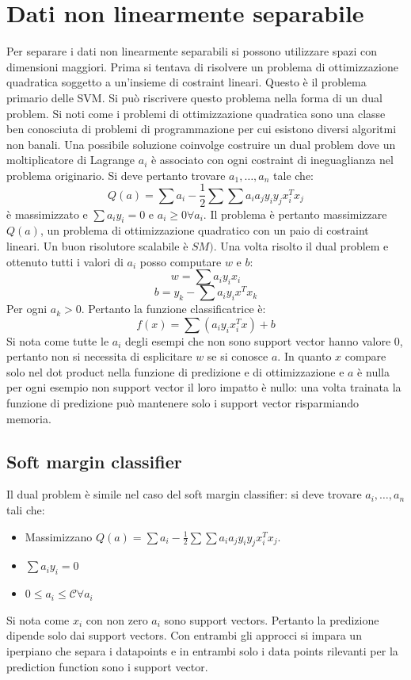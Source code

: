 \section{Dati non linearmente separabile}
Per separare i dati non linearmente separabili si possono utilizzare spazi con dimensioni maggiori.
Prima si tentava di risolvere un problema di ottimizzazione quadratica soggetto a un'insieme di costraint lineari.
Questo \`e il problema primario delle SVM.
Si pu\`o riscrivere questo problema nella forma di un dual problem.
Si noti come i problemi di ottimizzazione quadratica sono una classe ben conosciuta di problemi di programmazione per cui esistono diversi algoritmi non banali.
Una possibile soluzione coinvolge costruire un dual problem dove un moltiplicatore di Lagrange $a_i$ \`e associato con ogni costraint di ineguaglianza nel problema originario.
Si deve pertanto trovare $a_1,\dots,a_n$ tale che:
$$Q(a) = \sum a_i - \frac{1}{2}\sum\sum a_ia_jy_iy_jx_i^Tx_j$$
\`e massimizzato e $\sum a_iy_i = 0$ e $a_i\ge 0\forall a_i$.
Il problema \`e pertanto massimizzare $Q(a)$, un problema di ottimizzazione quadratico con un paio di costraint lineari.
Un buon risolutore scalabile \`e $SM)$.
Una volta risolto il dual problem e ottenuto tutti i valori di $a_i$ posso computare $w$ e $b$:
$$w=\sum a_iy_ix_i$$
$$b = y_k - \sum a_iy_ix^Tx_k$$
Per ogni $a_k>0$.
Pertanto la funzione classificatrice \`e:
$$f(x) = \sum(a_iy_ix_i^Tx)+b$$
Si nota come tutte le $a_i$ degli esempi che non sono support vector hanno valore $0$, pertanto non si necessita di esplicitare $w$ se si conosce $a$.
In quanto $x$ compare solo nel dot product nella funzione di predizione e di ottimizzazione e $a$ \`e nulla per ogni esempio non support vector il loro impatto \`e nullo: una volta trainata la funzione di predizione pu\`o mantenere solo i support vector risparmiando memoria.

	\subsection{Soft margin classifier}
	Il dual problem \`e simile nel caso del soft margin classifier: si deve trovare $a_i,\dots, a_n$ tali che:
	\begin{itemize}
		\item Massimizzano $Q(a) = \sum a_i-\frac{1}{2}\sum\sum a_ia_jy_iy_jx_i^Tx_j$.
		\item $\sum a_iy_i = 0$
		\item $0\le a_i\le \mathcal{C}\forall a_i$
	\end{itemize}
	Si nota come $x_i$ con non zero $a_i$ sono support vectors.
	Pertanto la predizione dipende solo dai support vectors.
	Con entrambi gli approcci si impara un iperpiano che separa i datapoints e in entrambi solo i data points rilevanti per la prediction function sono i support vector.

